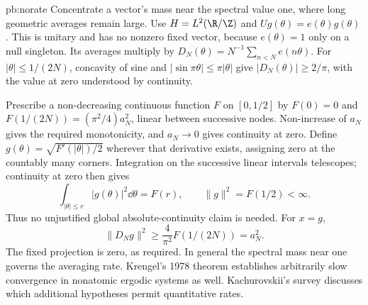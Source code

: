 \begin{solution}{pb:norate}
\idea Concentrate a vector's mass near the spectral value one, where long geometric averages remain large.
\writeup Use $H=L^2(\R/\Z)$ and $Ug(\theta)=e(\theta)g(\theta)$. This is unitary and has no nonzero fixed vector, because $e(\theta)=1$ only on a null singleton. Its averages multiply by $D_N(\theta)=N^{-1}\sum_{n<N}e(n\theta)$. For $|\theta|\le1/(2N)$, concavity of sine and $|\sin\pi\theta|\le\pi|\theta|$ give $|D_N(\theta)|\ge2/\pi$, with the value at zero understood by continuity.

Prescribe a non-decreasing continuous function $F$ on $[0,1/2]$ by $F(0)=0$ and $F(1/(2N))=(\pi^2/4)a_N^2$, linear between successive nodes. Non-increase of $a_N$ gives the required monotonicity, and $a_N\to0$ gives continuity at zero. Define $g(\theta)=\sqrt{F'(|\theta|)/2}$ wherever that derivative exists, assigning zero at the countably many corners. Integration on the successive linear intervals telescopes; continuity at zero then gives
\[\int_{|\theta|\le r}|g(\theta)|^2\dd\theta=F(r),\qquad
\|g\|^2=F(1/2)<\infty.
\]
Thus no unjustified global absolute-continuity claim is needed. For $x=g$,
\[\|D_Ng\|^2\ge\frac4{\pi^2}F(1/(2N))=a_N^2.
\]
The fixed projection is zero, as required.
\leads In general the spectral mass near one governs the averaging rate. Krengel's 1978 theorem establishes arbitrarily slow convergence in nonatomic ergodic systems as well. Kachurovskii's survey discusses which additional hypotheses permit quantitative rates.
\end{solution}

